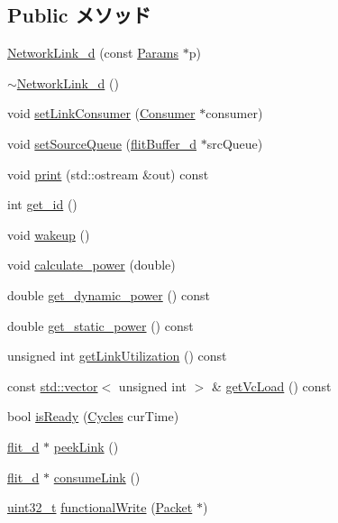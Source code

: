 \subsection*{Public メソッド}
\begin{DoxyCompactItemize}
\item 
\hyperlink{classNetworkLink__d_ad6f3b9635c28c2ba4852a7ccd83044bf}{NetworkLink\_\-d} (const \hyperlink{classNetworkLink__d_a1384b11c71bbcc86aab6a3a201f7a51e}{Params} $\ast$p)
\item 
\hyperlink{classNetworkLink__d_a2e51acea4c9f96234486b987d7eeaba4}{$\sim$NetworkLink\_\-d} ()
\item 
void \hyperlink{classNetworkLink__d_a0572f6732a488d1b8cc8e494e88d0fb3}{setLinkConsumer} (\hyperlink{classConsumer}{Consumer} $\ast$consumer)
\item 
void \hyperlink{classNetworkLink__d_ae50654abbfb3735dc3eb38760f67dd85}{setSourceQueue} (\hyperlink{classflitBuffer__d}{flitBuffer\_\-d} $\ast$srcQueue)
\item 
void \hyperlink{classNetworkLink__d_ac55fe386a101fbae38c716067c9966a0}{print} (std::ostream \&out) const 
\item 
int \hyperlink{classNetworkLink__d_a1f0b8f09abd10342468ce33a1da15557}{get\_\-id} ()
\item 
void \hyperlink{classNetworkLink__d_ae674290a26ecbd622c5160e38e8a4fe9}{wakeup} ()
\item 
void \hyperlink{classNetworkLink__d_a9f658913fdb0d349f8b713bf7e878ddf}{calculate\_\-power} (double)
\item 
double \hyperlink{classNetworkLink__d_a10bdb0a8b5af73052370b12b1045bd10}{get\_\-dynamic\_\-power} () const 
\item 
double \hyperlink{classNetworkLink__d_aeb5933543cfdeb1668baed5ce7c68351}{get\_\-static\_\-power} () const 
\item 
unsigned int \hyperlink{classNetworkLink__d_a268a57ca669794bfa1abea88af8fe2f9}{getLinkUtilization} () const 
\item 
const \hyperlink{classstd_1_1vector}{std::vector}$<$ unsigned int $>$ \& \hyperlink{classNetworkLink__d_ac460400c34855ef93de2d591ba56f803}{getVcLoad} () const 
\item 
bool \hyperlink{classNetworkLink__d_ae19b07af91a49435139ba13f5665b239}{isReady} (\hyperlink{classCycles}{Cycles} curTime)
\item 
\hyperlink{classflit__d}{flit\_\-d} $\ast$ \hyperlink{classNetworkLink__d_af2fb50a550cfec574c35b332334846c3}{peekLink} ()
\item 
\hyperlink{classflit__d}{flit\_\-d} $\ast$ \hyperlink{classNetworkLink__d_acc5b43c03ea5b36923b9bf8a38fcc6da}{consumeLink} ()
\item 
\hyperlink{Type_8hh_a435d1572bf3f880d55459d9805097f62}{uint32\_\-t} \hyperlink{classNetworkLink__d_aba9037f662122b5f2e85647d35670e5c}{functionalWrite} (\hyperlink{classPacket}{Packet} $\ast$)
\end{DoxyCompactItemize}
